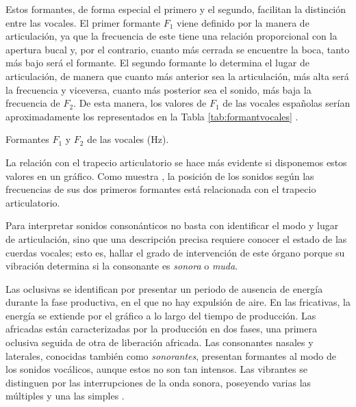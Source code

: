 Estos formantes, de forma especial el primero y el segundo, facilitan la distinción entre las vocales. El primer formante $F_1$ viene definido por la manera de articulación, ya que la frecuencia de este tiene una relación proporcional con la apertura bucal y, por el contrario,  cuanto más cerrada se encuentre la boca, tanto más bajo será el formante. El segundo formante lo determina el lugar de articulación, de manera que cuanto más anterior sea la articulación, más alta será la frecuencia y viceversa, cuanto más posterior sea el sonido, más baja la frecuencia de $F_2$. De esta manera, los valores de $F_1$ de las vocales españolas serían aproximadamente los representados en la Tabla \ref{tab:formantvocales} \parencite[101]{clegg2018}.

\begin{table}[!ht]
	\centering\small
	
	\caption{Formantes $F_1$ y $F_2$ de las vocales (Hz).}
	\label{tab:formantvocales}
\end{table}

La relación con el trapecio articulatorio se hace más evidente si disponemos estos valores en un gráfico. Como muestra , la posición de los sonidos según las frecuencias de sus dos primeros formantes está relacionada con el trapecio articulatorio.

Para interpretar sonidos consonánticos no basta con identificar el modo y lugar de articulación, sino que una descripción precisa requiere conocer el estado de las cuerdas vocales; esto es, hallar el grado de intervención de este órgano porque su vibración determina si la consonante es \textit{sonora} o \textit{muda}.

Las oclusivas se identifican por presentar un periodo de ausencia de energía durante la fase productiva, en el que no hay expulsión de aire. En las fricativas, la energía se extiende por el gráfico a lo largo del tiempo de producción. Las africadas están caracterizadas por la producción en dos fases, una primera oclusiva seguida de otra de liberación africada. Las consonantes nasales y laterales, conocidas también como \textit{sonorantes}, presentan formantes al modo de los sonidos vocálicos, aunque estos no son tan intensos. Las vibrantes se distinguen por las interrupciones de la onda sonora, poseyendo varias las múltiples y una las simples  \parencite[101-102]{clegg2018}.


